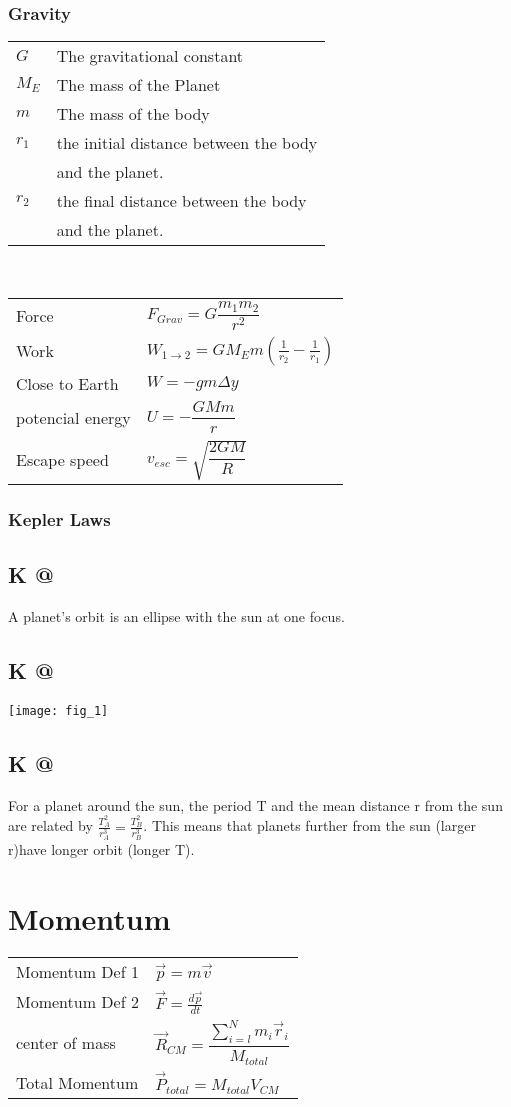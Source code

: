 \documentclass[5pt]{article}
\makeatletter
\newcommand*{\rom}[1]{\expandafter\@slowromancap\romannumeral #1@}
\makeatother
\begin{document}
\begin{multicols}{3}
\subsubsection{Gravity}
\begin{tabular}{ll}
$G$ & The gravitational constant\\
$M_E$ & The mass of the Planet\\
$m$ & The mass of the body\\
$r_1$ & the initial distance between the body\\ &and the planet.\\
$r_2$ & the final distance between the body\\ &and the planet.\\
\end{tabular}
\\
\begin{tabular}{ll}
Force & $F_{Grav}=G\dfrac{m_1m_2}{r^2}$\\
Work  & $W_{1\to 2}=GM_Em\left(\frac{1}{r_2}-\frac{1}{r_1}\right)$\\
Close to Earth & $W=-gm\Delta y$\\
potencial energy & $U=-\dfrac{GMm}{r}$\\
Escape speed & $v_{esc}=\sqrt{\dfrac{2GM}{R}}$
\end{tabular}

\subsubsection{Kepler Laws}
\subsection{K \rom{1}}
A planet's orbit is an ellipse with the sun at one focus.

\subsection{K \rom{2}}
\texttt{[image: fig\_1]}

\subsection{K \rom{3}}
For a planet around the sun, the period T and the mean distance r from the sun are related by $\frac{T^2_A}{r^3_A} = \frac{T^2_B}{r^3_B}$. This means that planets further from the sun (larger r)have longer orbit (longer T).

\section{Momentum}
\begin{tabular}{ll}
Momentum Def 1  & $\vec{p}=m\vec{v}$\\
Momentum Def 2  & $\Vec{F}=\frac{d\vec{p}}{dt}$\\
center of mass & $\vec{R}_{CM}=\dfrac{\sum^N_{i=l}m_i\vec{r}_i}{M_{total}}$\\
Total Momentum & $\Vec{P}_{total}=M_{total}V_{CM}$\\
\end{tabular}


\end{multicols}
\end{document}

